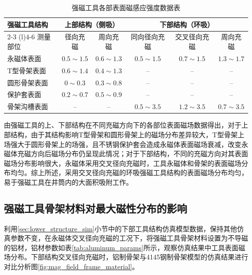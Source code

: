 \begin{table}[htbp]
    \centering
    \caption{强磁工具各部表面磁感应强度数据表}
    \label{tab:strong_magnet_data}
    \renewcommand{\arraystretch}{1.25}
    \small
    \begin{tabular}{lccccc}
        \toprule
        强磁工具结构 & \multicolumn{2}{c}{上部结构（侧吸）} & \multicolumn{3}{c}{下部结构（环吸）} \\
        \cmidrule(r){2-3} \cmidrule(l){4-6}
        测量部位 & 径向充磁 & 周向充磁 & 同向径向充磁 & 交叉径向充磁 & 周向充磁 \\
        \midrule
        永磁体表面 & $0.5\sim 1.5$ & $0.6\sim 1.3$ & $0.5\sim 1.5$ & $0.7\sim 1.5$ & $1.3\sim 1.7$ \\
        T型骨架表面 & $0.6\sim 1.4$ & $0.4\sim 1.3$ & -- & -- & -- \\
        圆形骨架表面 & $0\sim 0.3$ & $0.3\sim 0.8$ & -- & -- & -- \\
        保护套表面 & $0.2\sim 0.7$ & $0.5\sim 0.9$ & -- & -- & -- \\
        骨架沟槽表面 & -- & -- & $0.5\sim 3.5$ & $1.2\sim 3.5$ & $0.7\sim 3.5$ \\
        \bottomrule
    \end{tabular}
    \par{}
\end{table}

由强磁工具的上、下部结构在不同充磁方向下的各部位表面磁场数据得出，对于上部结构，由于其结构影响T型骨架和圆形骨架上的磁场分布差异较大，T型骨架上场强大于圆形骨架上的场强，且不锈钢保护套会造成永磁体表面磁场衰减，改变永磁体充磁方向后磁场分布仍呈现此情况；对于下部结构，不同的充磁方向对其表面磁场分布影响很大，永磁体采用交叉径向充磁时，工具永磁体和骨架的表面磁场分布均匀。综上所述，采用交叉径向充磁的环吸强磁工具结构的表面磁场分布均匀，易于强磁工具在井筒内的大面积吸附工作。

\subsection{强磁工具骨架材料对最大磁性分布的影响}

利用\ref{sec:lower_structure_sim}小节中的下部工具结构仿真模型数据，保持其他仿真参数不变，在永磁体交叉径向充磁的工况下，将强磁工具骨架材料设置为不导磁的铝材，铝材参数如表\ref{tab:aluminum_params}所示，观察仿真结果中工具表面磁场分布。下部结构交叉径向充磁时，铝制骨架与4145钢制骨架模型的仿真结果进行对比分析图\ref{fig:mag_field_frame_material}。

